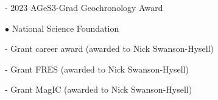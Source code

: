 \documentclass{ucbthesis}
\begin{document}
\begin{frontmatter}
\begin{acknowledgements}
    - 2023 AGeS3-Grad Geochronology Award

$\bullet$ National Science Foundation
    \vspace{5mm}

    - Grant career award  (awarded to Nick Swanson-Hysell)

    - Grant FRES  (awarded to Nick Swanson-Hysell)

    - Grant MagIC  (awarded to Nick Swanson-Hysell)
    
\end{acknowledgements}

\end{frontmatter}

\pagestyle{headings}





\printbibliography

\end{document}

